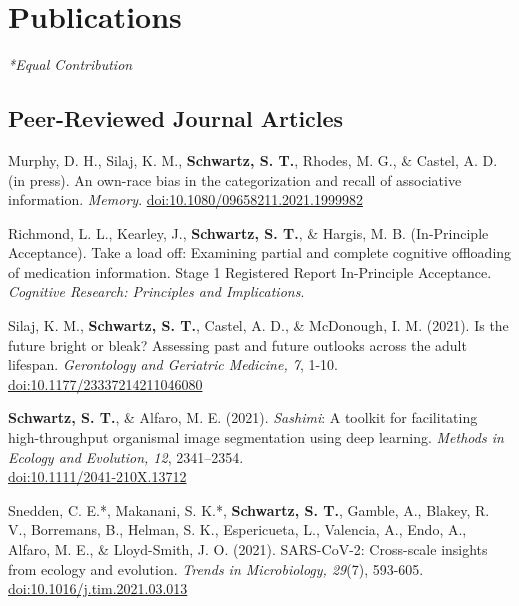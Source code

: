 \section*{Publications}
\textit{*Equal Contribution}
\subsection*{Peer-Reviewed Journal Articles}
Murphy, D. H., Silaj, K. M., \textbf{Schwartz, S. T.}, Rhodes, M. G., \& Castel, A. D. (in press). An own-race bias in the categorization and recall of associative information. \textit{Memory}. \textcolor{RoyalBlue}{\href{https://doi.org/10.1080/09658211.2021.1999982}{doi:10.1080/09658211.2021.1999982}}

\pubspace

Richmond, L. L., Kearley, J., \textbf{Schwartz, S. T.}, \& Hargis, M. B. (In-Principle Acceptance). Take a load off: Examining partial and complete cognitive offloading of medication information. Stage 1 Registered Report In-Principle Acceptance. \textit{Cognitive Research: Principles and Implications}.

\pubspace

Silaj, K. M., \textbf{Schwartz, S. T.}, Castel, A. D., \& McDonough, I. M. (2021). Is the future bright or bleak? Assessing past and future outlooks across the adult lifespan. \textit{Gerontology and Geriatric Medicine, 7}, 1-10. \textcolor{RoyalBlue}{\href{https://doi.org/10.1177/23337214211046080}{doi:10.1177/23337214211046080}}

\pubspace

\textbf{Schwartz, S. T.}, \& Alfaro, M. E. (2021). \textit{Sashimi}: A toolkit for facilitating high-throughput organismal image segmentation using deep learning. \textit{Methods in Ecology and Evolution, 12}, 2341–2354.\\ \textcolor{RoyalBlue}{\href{https://doi.org/10.1111/2041-210X.13712}{doi:10.1111/2041-210X.13712}}

\pubspace

Snedden, C. E.*, Makanani, S. K.*, \textbf{Schwartz, S. T.}, Gamble, A., Blakey, R. V., Borremans, B., Helman, S. K., Espericueta, L., Valencia, A., Endo, A., Alfaro, M. E., \& Lloyd-Smith, J. O. (2021). SARS-CoV-2: Cross-scale insights from ecology and evolution. \textit{Trends in Microbiology, 29}(7), 593-605.\\
\textcolor{RoyalBlue}{\href{https://doi.org/10.1016/j.tim.2021.03.013}{doi:10.1016/j.tim.2021.03.013}}


